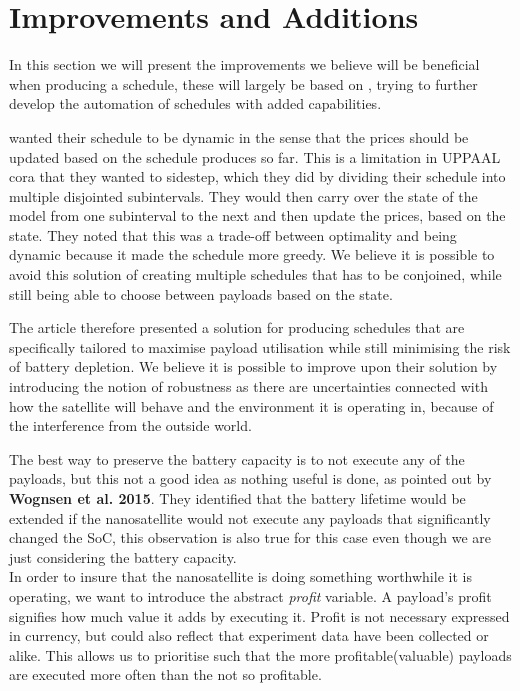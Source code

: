 \section{Improvements and Additions}
In this section we will present the improvements we believe will be beneficial when producing a schedule, these will largely be based on \cite{gomx3}, trying to further develop the automation of schedules with added capabilities.

\cite{gomx3} wanted their schedule to be dynamic in the sense that the prices should be updated based on the schedule produces so far. This is a limitation in UPPAAL \gls {cora} that they wanted to sidestep, which they did by dividing their schedule into multiple disjointed subintervals. They would then carry over the state of the model from one subinterval to the next and then update the prices, based on the state. They noted that this was a trade-off between optimality and being dynamic because it made the schedule more greedy. We believe it is possible to avoid this solution of creating multiple schedules that has to be conjoined, while still being able to choose between payloads based on the state. %

The article therefore presented a solution for producing schedules that are specifically tailored to maximise payload utilisation while still minimising the risk of battery depletion. We believe it is possible to improve upon their solution by introducing the notion of robustness as there are uncertainties connected with how the satellite will behave and the environment it is operating in, because of the interference from the outside world.

The best way to preserve the battery capacity is to not execute any of the payloads, but this not a good idea as nothing useful is done, as pointed out by \textbf{Wognsen et al. 2015}\cite{score_function}. They identified that the battery lifetime would be extended if the nanosatellite would not execute any payloads that significantly changed the SoC, this observation is also true for this case even though we are just considering the battery capacity.\\
In order to insure that the nanosatellite is doing something worthwhile it is operating, we want to introduce the abstract \textit{profit} variable. A payload's profit signifies how much value it adds by executing it. Profit is not necessary expressed in currency, but could also reflect that experiment data have been collected or alike. This allows us to prioritise such that the more profitable(valuable) payloads are executed more often than the not so profitable.

